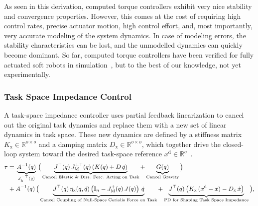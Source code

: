 As seen in this derivation, computed torque controllers exhibit very nice stability and convergence properties. However, this comes at the cost of requiring high control rates, precise actuator motion, high control effort, and, most importantly, very accurate modeling of the system dynamics. In case of modeling errors, the stability characteristics can be lost, and the unmodelled dynamics can quickly become dominant.
So far, computed torque controllers have been verified for fully actuated soft robots in simulation~\citep{boyer2006macro, pustina2024unified}, but to the best of our knowledge, not yet experimentally.


\subsubsection{Task Space Impedance Control}
A task-space impedance controller uses partial feedback linearization to cancel out the original task dynamics and replace them with a new set of linear dynamics in task space. These new dynamics are defined by a stiffness matrix $K_\mathrm{x} \in \mathbb{R}^{o \times o}$ and a damping matrix $D_\mathrm{x} \in \mathbb{R}^{o \times o}$, which together drive the closed-loop system toward the desired task-space reference $x^\mathrm{d} \in \mathbb{R}^o$~\citep{khatib1987unified, della2020model}.
\begin{equation}\small
\begin{split}
    \tau =& \: \underbrace{A^{-1}(q)}_{J_\mathrm{h}^{-\top}(q)} \, \big ( \underbrace{J^\top(q) \, J_\mathrm{M}^{+\top}(q) \left ( K(q) + D \, \dot{q} \right )}_\text{Cancel Elastic \& Diss. Forc. Acting on Task} + \underbrace{G(q)}_\text{Cancel Gravity} \big )\\
    + & \: A^{-1}(q) \, \big ( \underbrace{J^\top(q) \, \eta_\mathrm{x}(q,\dot{q}) \left ( \mathbb{I}_n - J_\mathrm{M}^{+}(q) \, J(q)  \right ) \, \dot{q}}_\text{Cancel Coupling of Null-Space Coriolis Force on Task} + \underbrace{J^\top(q) \left ( K_\mathrm{x} \, (x^\mathrm{d} - x) - D_\mathrm{x} \, \dot{x} \right )}_{\text{PD for Shaping Task Space Impedance}} \big ),
\end{split}
\end{equation}
